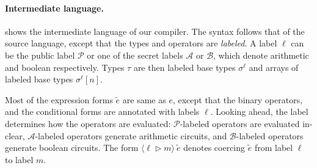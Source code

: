 \paragraph{Intermediate language.}  shows the
intermediate language of our compiler. The syntax follows that of the source
language, except that the types and operators are \emph{labeled}. 
A label $\ell$ can be the  public label $\mathcal{P}$ or  one of the secret labels $\mathcal{A}$ or
$\mathcal{B}$, which denote arithmetic and boolean respectively.
Types $\tau$ are then
labeled base types $\sigma^{\ell}$ and arrays of labeled base types
$\sigma^{\ell}[n]$.

Most of the expression forms $\widetilde{e}$ are same as $e$, except
that the binary operators, and the conditional forms
are annotated with labels $\ell$.
Looking ahead, the label determines how the operators are
evaluated: $\mathcal{P}$-labeled operators are evaluated in-clear, $\mathcal{A}$-labeled operators generate arithmetic circuits, and
$\mathcal{B}$-labeled operators generate boolean circuits. The
form $\langle \ell \rhd m \rangle\:\widetilde{e}$ denotes coercing
$\widetilde{e}$ from label $\ell$ to label $m$.

